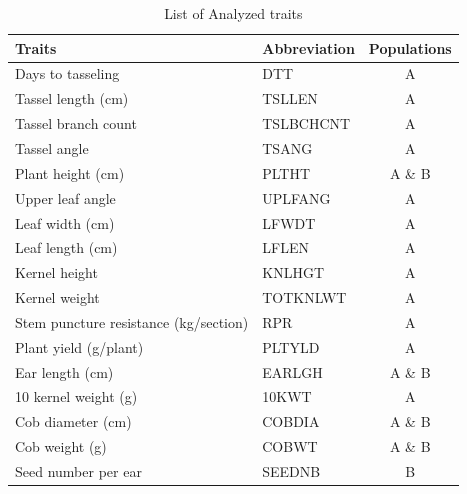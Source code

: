 \documentclass[12pt]{article}
\begin{document}
\begin{table}[ht]
  \begin{center}
{\fontsize{10}{10}\sf
\caption[]{List of Analyzed traits}
\begin{tabular}{llc} \hline
\toprule
Traits & Abbreviation & Populations \\	 \hline\hline
Days to tasseling	&	DTT	&	A	\\
Tassel length (cm)	&	TSLLEN	&	A	\\
Tassel branch count	&	TSLBCHCNT	&	A	\\
Tassel angle	&	TSANG	&	A	\\
Plant height (cm)	&	PLTHT	&	A \& B	\\
Upper leaf angle	&	UPLFANG	&	A	\\
Leaf width (cm)	&	LFWDT	&	A	\\
Leaf length (cm)	&	LFLEN	&	A	\\
Kernel height	&	KNLHGT	&	A	\\
Kernel weight 	&	TOTKNLWT	&	A	\\
Stem puncture resistance (kg/section)	&	RPR	&	A	\\
Plant yield (g/plant)	&	PLTYLD	&	A	\\
Ear length (cm)	&	EARLGH	&	A \& B	\\
10 kernel weight (g)	&	10KWT	&	A	\\
Cob diameter (cm)	&	COBDIA	&	A \& B	\\
Cob weight (g)	&	COBWT	&	A \& B	\\
Seed number per ear	&	SEEDNB	&	B	\\
\bottomrule
\end{tabular}
\label{Traits}  
}
  \end{center}
\end{table}
\end{document}

